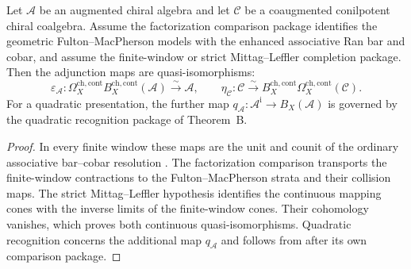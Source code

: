 \begin{corollary}\label{cor:bar-cobar-inverse}
Let $\mathcal A$ be an augmented chiral algebra and let $\mathcal C$
be a coaugmented conilpotent chiral coalgebra. Assume the factorization
comparison package identifies the geometric Fulton--MacPherson models
with the enhanced associative Ran bar and cobar, and assume the
finite-window or strict Mittag--Leffler completion package. Then the
adjunction maps are quasi-isomorphisms:
\[
\varepsilon_{\mathcal A}\colon
\Omega_X^{\mathrm{ch,cont}}B_X^{\mathrm{ch,cont}}(\mathcal A)
\xrightarrow{\sim}\mathcal A,
\qquad
\eta_{\mathcal C}\colon
\mathcal C\xrightarrow{\sim}
B_X^{\mathrm{ch,cont}}\Omega_X^{\mathrm{ch,cont}}(\mathcal C).
\]
For a quadratic presentation, the further map
$q_{\mathcal A}\colon\mathcal A^{\mathrm i}\to B_X(\mathcal A)$ is
governed by the quadratic recognition package of Theorem~B.
\end{corollary}

\begin{proof}
In every finite window these maps are the unit and counit of the
ordinary associative bar--cobar resolution
\cite[Corollary~2.3.4]{LV12}.  The factorization comparison transports
the finite-window contractions to the Fulton--MacPherson strata and
their collision maps.  The strict Mittag--Leffler hypothesis identifies
the continuous mapping cones with the inverse limits of the
finite-window cones.  Their cohomology vanishes, which proves both
continuous quasi-isomorphisms.  Quadratic recognition concerns the
additional map $q_{\mathcal A}$ and follows from
\cite[Theorem~3.4.6]{LV12} after its own comparison package.
\end{proof}

